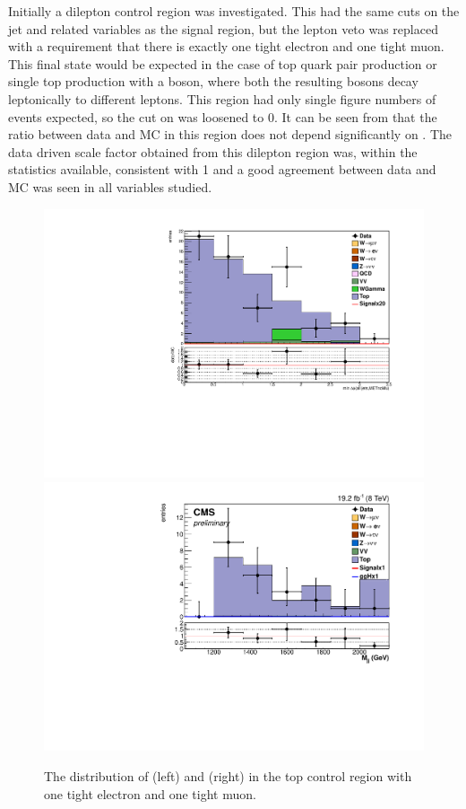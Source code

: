 Initially a dilepton control region was investigated. This had the same cuts on the jet and \MET related variables as the signal region, but the lepton veto was replaced with a requirement that there is exactly one tight electron and one tight muon. This final state would be expected in the case of top quark pair production or single top production with a \PW boson, where both the resulting \PW bosons decay leptonically to different leptons. This region had only single figure numbers of events expected, so the cut on \jetmetdphi was loosened to 0. It can be seen from  that the ratio between data and MC in this region does not depend significantly on \jetmetdphi. The data driven scale factor obtained from this dilepton region was, within the statistics available, consistent with 1 and a good agreement between data and \ac{MC} was seen in all variables studied.

\begin{figure}
  \includegraphics[width=.65\largefigwidth]{plots/parked/topjetmetdphicut0.pdf}
  \includegraphics[width=.65\largefigwidth]{plots/parked/HIG-14-038-figs/output_sigreg/top_dijet_M.pdf}
  \caption{The distribution of \jetmetdphi (left) and \Mjj (right) in the top control region with one tight electron and one tight muon.}
  \label{fig:parkedtopjetmetdphi}
\end{figure}

